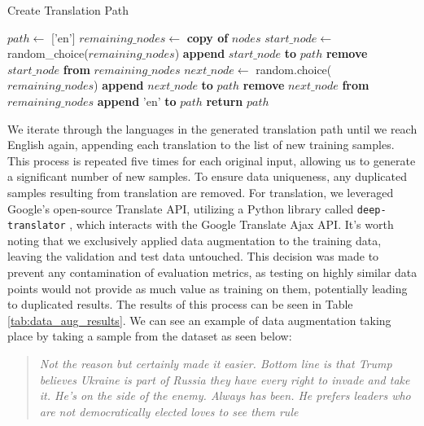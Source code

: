 \begin{algorithm}[H]
    \caption{Create Translation Path}
    \begin{algorithmic}[1]
        \State $path \gets $ ['en']
        \State $remaining\_nodes \gets $ \textbf{copy of} $nodes$
        \State
        \State $start\_node \gets $ random\_choice($remaining\_nodes$)
        \State \textbf{append} $start\_node$ \textbf{to} $path$
        \State \textbf{remove} $start\_node$ \textbf{from} $remaining\_nodes$
        \State
        \State $next\_node \gets $ random.choice($remaining\_nodes$)
        \State \textbf{append} $next\_node$ \textbf{to} $path$
        \State \textbf{remove} $next\_node$ \textbf{from} $remaining\_nodes$
        \EndWhile
        \State
        \State \textbf{append} 'en' \textbf{to} $path$
        \State \textbf{return} $path$
        \EndFunction
    \end{algorithmic}
    \label{alg:translation_path}
\end{algorithm}

We iterate through the languages in the generated translation path until we reach English again, appending each translation to the list of new training samples. This process is repeated five times for each original input, allowing us to generate a significant number of new samples. To ensure data uniqueness, any duplicated samples resulting from translation are removed. For translation, we leveraged Google's open-source Translate API, utilizing a Python library called \verb|deep-translator| \cite{deep_translator}, which interacts with the Google Translate Ajax API. It's worth noting that we exclusively applied data augmentation to the training data, leaving the validation and test data untouched. This decision was made to prevent any contamination of evaluation metrics, as testing on highly similar data points would not provide as much value as training on them, potentially leading to duplicated results. The results of this process can be seen in Table \ref{tab:data_aug_results}. We can see an example of data augmentation taking place by taking a sample from the dataset as seen below:

\begin{quote}
    \textit{Not the reason but certainly made it easier. Bottom line is that Trump believes Ukraine is part of Russia they have every right to invade and take it. He's on the side of the enemy. Always has been. He prefers leaders who are not democratically elected loves to see them rule}
\end{quote}

